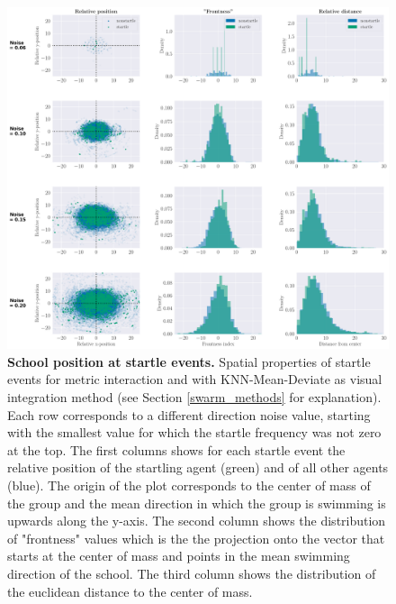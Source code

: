     \begin{figure}[H]
    \begin{center}
    \includegraphics[width=\textwidth]{looming_swarm_startle_stats.pdf}
    \end{center}
    \caption{\textbf{School position at startle events.} Spatial properties of startle events for metric interaction and with KNN-Mean-Deviate as visual integration method (see Section \ref{swarm_methods} for explanation). Each row corresponds to a different direction noise value, starting with the smallest value for which the startle frequency was not zero at the top. The first columns shows for each startle event the relative position of the startling agent (green) and of all other agents (blue). The origin of the plot corresponds to the center of mass of the group and the mean direction in which the group is swimming is upwards along the y-axis. The second column shows the distribution of "frontness" values which is the the projection onto the vector that starts at the center of mass and points in the mean swimming direction of the school. The third column shows the distribution of the euclidean distance to the center of mass.}
    \label{fig:swarm_startle_stats}
    \end{figure}
    
